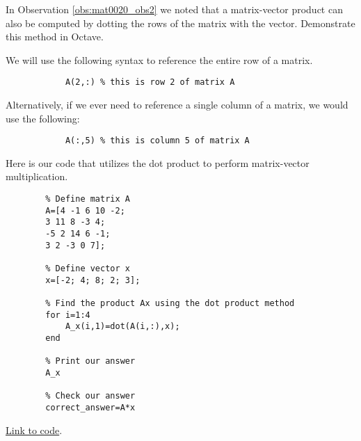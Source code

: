 \documentclass{ximera}
\begin{document}
\begin{example}\label{ex_oct_mat_prod_dot}
In Observation \ref{obs:mat0020_obs2} we noted that a matrix-vector product can also be computed by dotting the rows of the matrix with the vector.  Demonstrate this method in Octave.
    \begin{explanation}
        We will use the following syntax to reference the entire row of a matrix.
        \begin{verbatim}
            A(2,:) % this is row 2 of matrix A
        \end{verbatim}
        Alternatively, if we ever need to reference a single column of a matrix, we would use the following:
        \begin{verbatim}
            A(:,5) % this is column 5 of matrix A
        \end{verbatim}

    Here is our code that utilizes the dot product to perform matrix-vector multiplication.

    \begin{verbatim}
        % Define matrix A 
        A=[4 -1 6 10 -2;  
        3 11 8 -3 4;  
        -5 2 14 6 -1;  
        3 2 -3 0 7];  
        
        % Define vector x  
        x=[-2; 4; 8; 2; 3];  
        
        % Find the product Ax using the dot product method
        for i=1:4  
            A_x(i,1)=dot(A(i,:),x);  
        end  
        
        % Print our answer  
        A_x  
        
        % Check our answer  
        correct_answer=A*x  
    \end{verbatim}

    \href{https://sagecell.sagemath.org/?z=eJxdj0FLAzEQhe-F_od3KXSlgWZ3raUlh6B49uKpSCmbqRukicxmNT_f2ahFDDnMvO_NG2aBBzr7QLicEvsMi_nMmkMLpbGBXkPVe4jWQGtsoRq0pVe3qKFb8Sj9Y6gnusbdS-nlL_A8ECtXFjh8UJciI080m8MULFnbPaRo_gw9-uCQesI7Rzd2CTZjHHx4LaKL6QoulPro5rOzxHqjd23JkGePeelXujLiXlopd9UqV2UFSfjvpif2ISGOjFMYPoknIKNXft9T9_aPd5FZDjl-K8be5C-N81KK&lang=octave&interacts=eJyLjgUAARUAuQ==}{Link to code}.
    \end{explanation}
\end{example}

    
\end{document}

